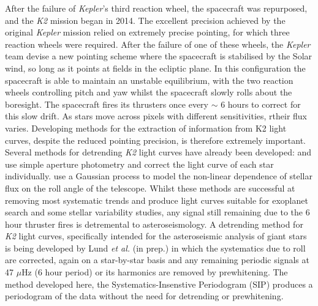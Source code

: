 \documentclass[useAMS, usenatbib]{aastex}
\begin{document}
After the failure of {\it Kepler}'s third reaction wheel, the spacecraft was
repurposed, and the {\it K2} mission began in 2014.
The excellent precision achieved by the original {\it Kepler} mission relied
on extremely precise pointing, for which three reaction wheels were required.
After the failure of one of these wheels, the {\it Kepler} team devise a new
pointing scheme where the spacecraft is stabilised by the Solar wind, so long
as it points at fields in the ecliptic plane.
In this configuration the spacecraft is able to maintain an unstable
equilibrium, with the two reaction wheels controlling pitch and yaw whilst the
spacecraft slowly rolls about the boresight.
The spacecraft fires its thrusters once every $\sim$ 6 hours to correct for
this slow drift.
As stars move across pixels with different sensitivities, rtheir flux varies.
Developing methods for the extraction of information from K2 light
curves, despite the reduced pointing precision, is therefore extremely
important.
Several methods for detrending {\it K2} light curves have already been
developed: \citet{Vanderburg2014} and \citet{Crossfield2015} use simple
aperture photometry and correct the light curve of each star individually.
\citet{Aigrain2015} use a Gaussian process to model the non-linear dependence
of stellar flux on the roll angle of the telescope.
Whilst these methods are successful at removing most systematic trends and
produce light curves suitable for exoplanet search and some stellar
variability studies, any signal still remaining due to the 6 hour thruster
fires is detremental to asteroseismology.
A detrending method for {\it K2} light curves, specifically intended for the
asteroseismic analysis of giant stars is being developed by Lund {\it et al.}
(in prep.) in which the systematics due to roll are corrected, again on
a star-by-star basis and any remaining periodic signals at 47 $\mu$Hz (6 hour
period) or its harmonics are removed by prewhitening.
The method developed here, the Systematics-Insenstive Periodogram (SIP)
produces a periodogram of the data without the need for detrending or
prewhitening.
\end{document}
